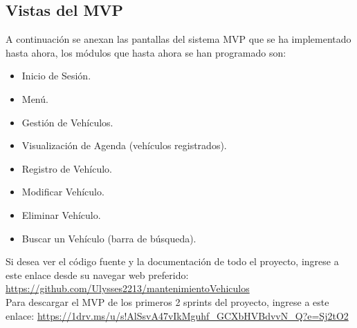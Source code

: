 \subsection{Vistas del MVP}
A continuación se anexan las pantallas del sistema MVP que se ha implementado hasta ahora, los módulos que hasta ahora se han programado son:
\begin{itemize}
	\item Inicio de Sesión.
	\item Menú.
	\item Gestión de Vehículos.
	\item Visualización de Agenda (vehículos registrados).
	\item Registro de Vehículo.
	\item Modificar Vehículo.
	\item Eliminar Vehículo.
	\item Buscar un Vehículo (barra de búsqueda).
\end{itemize}
Si desea ver el código fuente y la documentación de todo el proyecto, ingrese a este enlace desde su navegar web preferido: \url{https://github.com/Ulysses2213/mantenimientoVehiculos} \\

Para descargar el MVP de los primeros 2 sprints del proyecto, ingrese a este enlace: \url{https://1drv.ms/u/s!AlSsvA47vIkMguhf_GCXbHVBdvvN_Q?e=Sj2tO2} \\

